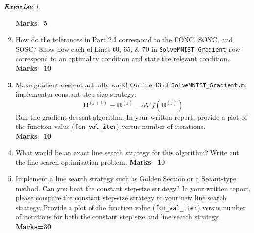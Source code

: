 \documentclass[12pt]{article}
\numberwithin{equation}{section}
\theoremstyle{remark}
\newtheorem{exercise}{\bf Exercise}
\newcommand{\vect}[1]{\boldsymbol{#1}}
\begin{document}
\begin{exercise}
\begin{enumerate}
\phantom{hi} \hfill {\bf Marks=5} 
%
\item How do the tolerances in Part 2.3 correspond to the FONC, SONC, and SOSC? Show how each of Lines 60, 65, \& 70 in \texttt{SolveMNIST\_Gradient} now correspond to an optimality condition and state the relevant condition.
\phantom{hi} \hfill {\bf Marks=10} 
%
\item Make gradient descent actually work! On line 43 of \texttt{SolveMNIST\_Gradient.m}, implement a constant step-size strategy:
%
\[
\vect{B}^{(j + 1)} = \vect{B}^{(j)} - \alpha \nabla f(\vect{B}^{(j)})
\]
%
Run the gradient descent algorithm. In your written report, provide a plot of the function value (\texttt{fcn\_val\_iter}) versus number of iterations. \\
\phantom{hi} \hfill {\bf Marks=10} 
%
\item What would be an exact line search strategy for this algorithm? Write out the line search optimisation problem.
%
\phantom{hi} \hfill {\bf Marks=10} 
%
\item Implement a line search strategy such as Golden Section or a Secant-type method. Can you beat the constant step-size strategy? In your written report, please compare the constant step-size strategy to your new line search strategy. Provide a plot of the function value (\texttt{fcn\_val\_iter}) versus number of iterations for both the constant step size and line search strategy.
\phantom{hi} \hfill {\bf Marks=30} 
%
\end{enumerate}
%
\end{exercise}
\end{document}
